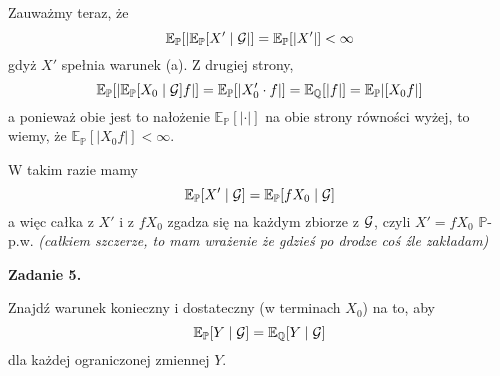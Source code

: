 \documentclass{article}
\newcommand{\E}{\mathbb{E}}
\renewcommand{\P}{\mathbb{P}}
\begin{document}
Zauważmy teraz, że
$$\E_{\P}[|\E_{\P}[X'\;|\;\set{G}|]=\E_{\P}[|X'|]<\infty$$
gdyż $X'$ spełnia warunek (a). Z drugiej strony,
$$\E_{\P}[|\E_{\P}[X_0\;|\;\set{G}]f|]=\E_{\P}[|X_0'\cdot f|]=\E_{\Q}[|f|]=\E_{\P}|[X_0f|]$$
a ponieważ obie jest to nałożenie $\E_{\P}[|\cdot|]$ na obie strony równości wyżej, to wiemy, że $\E_{\P}[|X_0f|]<\infty$.

W takim razie mamy
$$\E_{\P}[X'\;|\;\set{G}]=\E_{\P}[fX_0\;|\;\set{G}]$$
a więc całka z $X'$ i z $fX_0$ zgadza się na każdym zbiorze z $\mathcal{G}$, czyli $X'=fX_0$ $\P$-p.w. {\scriptsize\itshape(całkiem szczerze, to mam wrażenie że gdzieś po drodze coś źle zakładam)}
\bigskip

{\bfseries{\large\color{orange}Zadanie 5.}

  Znajdź warunek konieczny i dostateczny (w terminach $X_0$) na to, aby
  $$\E_{\P}[Y\;|\;\set{G}]=\E_{\Q}[Y\;|\;\set{G}]$$
  dla każdej ograniczonej zmiennej $Y$.
}
\end{document}
